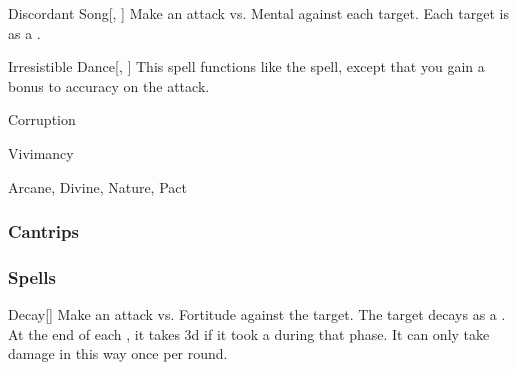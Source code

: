 \lowercase{\hypertarget{spell:Discordant Song}{}}\label{spell:Discordant Song}
\begin{freeability}[Rank 6]{\hypertarget{spell:Discordant Song}{Discordant Song}}[, ]
Make an attack vs. Mental against each target.
\hit Each target is \disoriented as a .
\end{freeability}
\vspace{0.25em}



\lowercase{\hypertarget{spell:Irresistible Dance}{}}\label{spell:Irresistible Dance}
\begin{freeability}[Rank 7]{\hypertarget{spell:Irresistible Dance}{Irresistible Dance}}[, ]
This spell functions like the  spell, except that you gain a  bonus to accuracy on the attack.
\end{freeability}
\vspace{0.25em}


\newpage
\begin{spellsection}{Corruption}

\begin{spellheader}
\end{spellheader}


 Vivimancy

 Arcane, Divine, Nature, Pact

\subsubsection{Cantrips}


\end{spellsection}


\subsubsection{Spells}


\lowercase{\hypertarget{spell:Decay}{}}\label{spell:Decay}
\begin{freeability}[Rank 1]{\hypertarget{spell:Decay}{Decay}}[]
Make an attack vs. Fortitude against the target.
\hit The target decays as a .
At the end of each , it takes  \minus3d if it took a  during that phase.
It can only take damage in this way once per round.
\end{freeability}
\vspace{0.25em}



